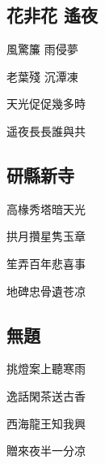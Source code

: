 \documentclass[a4j,12pt]{ltjtarticle}
\begin{document}
\begin{center}
	
	\vspace{2cm} %
	\vfill
	
	
	\newpage
	
	\begin{flushleft}
		\section{花非花 遙夜} 
	\end{flushleft}	
	
	\vfill
	\LARGE 風驚簾    雨侵夢\par
	老葉殘    沉潭凍\par
	天光促促幾多時 \par
	遥夜長長誰與共 \par

	\vspace{0.5cm} %
	\vfill
	
	
	\newpage 

	\begin{flushleft}
		\section{研縣新寺} 
	\end{flushleft}	

	\vfill
	\LARGE 高椽秀塔暗天光\par
	拱月攢星隽玉章\par
	笙弄百年悲喜事\par
	地碑忠骨遺苍凉\par
	\vspace{1.5cm} %
	\vfill
	
	\newpage

	\begin{flushleft}
		\section{無題} 
	\end{flushleft}	

	\vfill
	\LARGE 挑燈案上聽寒雨\par
	逸話閑茶送古香\par
	西海龍王知我興\par
	贈來夜半一分凉\par
	\vspace{1.5cm} %
	\vfill


\end{center}
\end{document}
